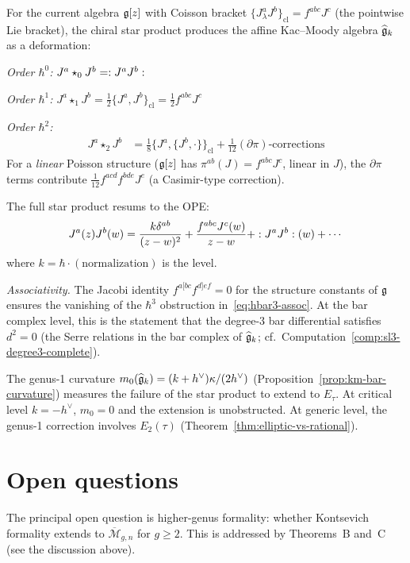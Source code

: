 \begin{computation}
\label{comp:current-star-product}

For the current algebra $\mathfrak{g}[z]$ with Coisson bracket
$\{J^a_\lambda J^b\}_{\mathrm{cl}} = f^{abc} J^c$ (the pointwise
Lie bracket), the chiral star product produces the affine Kac--Moody
algebra $\widehat{\mathfrak{g}}_k$ as a deformation:

\emph{Order $\hbar^0$:} $J^a \star_0 J^b = :{J^a J^b}:$

\emph{Order $\hbar^1$:}
$J^a \star_1 J^b = \frac{1}{2}\{J^a, J^b\}_{\mathrm{cl}}
= \frac{1}{2} f^{abc} J^c$

\emph{Order $\hbar^2$:}
\begin{align*}
J^a \star_2 J^b &= \frac{1}{8}
\{J^a, \{J^b, \cdot\}\}_{\mathrm{cl}}
+ \frac{1}{12} (\partial\pi)
\text{-corrections}
\end{align*}
For a \emph{linear} Poisson structure ($\mathfrak{g}[z]$ has
$\pi^{ab}(J) = f^{abc} J^c$, linear in $J$), the $\partial\pi$
terms contribute $\frac{1}{12} f^{acd}f^{bde} J^e$
(a Casimir-type correction).

The full star product resums to the OPE:
\begin{equation}\label{eq:km-as-deformation}
J^a(z) J^b(w) = \frac{k \delta^{ab}}{(z-w)^2}
+ \frac{f^{abc} J^c(w)}{z-w} + :{J^a J^b}:(w) + \cdots
\end{equation}
where $k = \hbar \cdot (\text{normalization})$ is the level.

\emph{Associativity.}
The Jacobi identity $f^{a[bc}f^{d]ef} = 0$ for the structure
constants of $\mathfrak{g}$ ensures the vanishing of the $\hbar^3$ obstruction
in~\eqref{eq:hbar3-assoc}.  At the bar complex level, this is the
statement that the degree-3 bar differential satisfies $d^2 = 0$
(the Serre relations in the bar complex of $\widehat{\mathfrak{g}}_k$;
cf.\ Computation~\ref{comp:sl3-degree3-complete}).
\end{computation}

\begin{remark}
\label{rem:quantization-curvature-connection}
The genus-1 curvature $m_0(\widehat{\mathfrak{g}}_k) = (k+h^\vee)\kappa/(2h^\vee)$ (Proposition~\ref{prop:km-bar-curvature}) measures the failure of the star product to extend to $E_\tau$.  At critical level $k = -h^\vee$, $m_0 = 0$ and the extension is unobstructed.  At generic level, the genus-1 correction involves $E_2(\tau)$ (Theorem~\ref{thm:elliptic-vs-rational}).
\end{remark}


\section{Open questions}\label{sec:open-questions}

The principal open question is higher-genus formality: whether Kontsevich formality extends to $\overline{\mathcal{M}}_{g,n}$ for $g \geq 2$.  This is addressed by Theorems~B and~C (see the discussion above).
